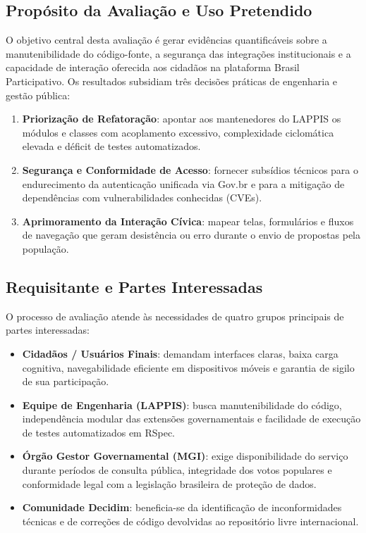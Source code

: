 \documentclass[journal]{IEEEtran}
\begin{document}
\subsection{Propósito da Avaliação e Uso Pretendido}
\label{sec:proposito}

O objetivo central desta avaliação é gerar evidências quantificáveis sobre a manutenibilidade do código-fonte, a segurança das integrações institucionais e a capacidade de interação oferecida aos cidadãos na plataforma Brasil Participativo. Os resultados subsidiam três decisões práticas de engenharia e gestão pública:

\begin{enumerate}
    \item \textbf{Priorização de Refatoração}: apontar aos mantenedores do LAPPIS os módulos e classes com acoplamento excessivo, complexidade ciclomática elevada e déficit de testes automatizados.
    \item \textbf{Segurança e Conformidade de Acesso}: fornecer subsídios técnicos para o endurecimento da autenticação unificada via Gov.br e para a mitigação de dependências com vulnerabilidades conhecidas (CVEs).
    \item \textbf{Aprimoramento da Interação Cívica}: mapear telas, formulários e fluxos de navegação que geram desistência ou erro durante o envio de propostas pela população.
\end{enumerate}

\subsection{Requisitante e Partes Interessadas}
\label{sec:stakeholders}

O processo de avaliação atende às necessidades de quatro grupos principais de partes interessadas:

\begin{itemize}
    \item \textbf{Cidadãos / Usuários Finais}: demandam interfaces claras, baixa carga cognitiva, navegabilidade eficiente em dispositivos móveis e garantia de sigilo de sua participação.
    \item \textbf{Equipe de Engenharia (LAPPIS)}: busca manutenibilidade do código, independência modular das extensões governamentais e facilidade de execução de testes automatizados em RSpec.
    \item \textbf{Órgão Gestor Governamental (MGI)}: exige disponibilidade do serviço durante períodos de consulta pública, integridade dos votos populares e conformidade legal com a legislação brasileira de proteção de dados.
    \item \textbf{Comunidade Decidim}: beneficia-se da identificação de inconformidades técnicas e de correções de código devolvidas ao repositório livre internacional.
\end{itemize}
\end{document}
